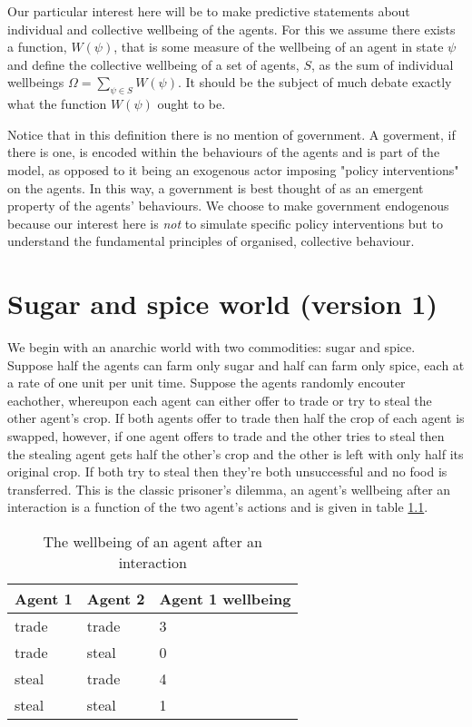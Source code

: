 \documentclass[a4paper]{report}
\begin{document}
Our particular interest here will be to make predictive statements about individual and collective wellbeing of the agents. For this we assume there exists a function, $W(\psi)$, that is some measure of the wellbeing of an agent in state $\psi$ and define the collective wellbeing of a set of agents, $S$, as the sum of individual wellbeings $\Omega = \sum_{\psi \in S} W(\psi)$. It should be the subject of much debate exactly what the function $W(\psi)$ ought to be.

Notice that in this definition there is no mention of government. A goverment, if there is one, is encoded within the behaviours of the agents and is part of the model, as opposed to it being an exogenous actor imposing "policy interventions" on the agents. In this way, a government is best thought of as an emergent property of the agents' behaviours. We choose to make government endogenous because our interest here is \textit{not} to simulate specific policy interventions but to understand the fundamental principles of organised, collective behaviour.

\chapter{Sugar and spice world (version 1)}

We begin with an anarchic world with two commodities: sugar and spice. Suppose half the agents can farm only sugar and half can farm only spice, each at a rate of one unit per unit time. Suppose the agents randomly encouter eachother, whereupon each agent can either offer to trade or try to steal the other agent's crop. If both agents offer to trade then half the crop of each agent is swapped, however, if one agent offers to trade and the other tries to steal then the stealing agent gets half the other's crop and the other is left with only half its original crop. If both try to steal then they're both unsuccessful and no food is transferred. This is the classic prisoner's dilemma, an agent's wellbeing after an interaction is a function of the two agent's actions and is given in table \ref{prisonersdilemmareward}.

\begin{table}
\begin{center}
\begin{tabular}{lll}
Agent 1  & Agent 2 & Agent 1 wellbeing \\
\hline
trade & trade & 3 \\
trade & steal  & 0 \\
steal & trade & 4 \\
steal & steal & 1 \\
\hline
\end{tabular}
\end{center}
\caption{The wellbeing of an agent after an interaction}
\label{prisonersdilemmareward}
\end{table}
\end{document}
